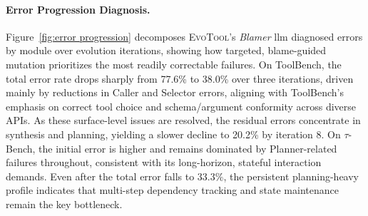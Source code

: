 \documentclass[11pt]{article}
\begin{document}
{%




\paragraph{Error Progression Diagnosis.} Figure~\ref{fig:error progression} decomposes \textsc{EvoTool}’s \emph{Blamer} llm diagnosed errors by module over evolution iterations, showing how targeted, blame-guided mutation prioritizes the most readily correctable failures. On ToolBench, the total error rate drops sharply from 77.6\% to 38.0\% over three iterations, driven mainly by reductions in Caller and Selector errors, aligning with ToolBench’s emphasis on correct tool choice and schema/argument conformity across diverse APIs. As these surface-level issues are resolved, the residual errors concentrate in synthesis and planning, yielding a slower decline to 20.2\% by iteration 8. On $\tau$-Bench, the initial error is higher and remains dominated by Planner-related failures throughout, consistent with its long-horizon, stateful interaction demands. Even after the total error falls to 33.3\%, the persistent planning-heavy profile indicates that multi-step dependency tracking and state maintenance remain the key bottleneck.


}
\end{document}
